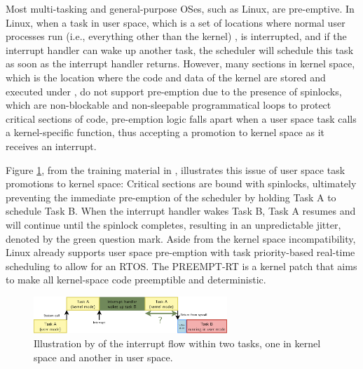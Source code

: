Most multi-tasking and general-purpose OSes, such as Linux, are pre-emptive. In Linux, when a task in user space, which is a set of locations where normal user processes run (i.e., everything other than the kernel) \cite{nlightnfotisAnswerWhatDifference2013}, is interrupted, and if the interrupt handler can wake up another task, the scheduler will schedule this task as soon as the interrupt handler returns. However, many sections in kernel space, which is the location where the code and data of the kernel are stored and executed under \cite{nlightnfotisAnswerWhatDifference2013}, do not support pre-emption due to the presence of spinlocks, which are non-blockable and non-sleepable programmatical loops to protect critical sections of code, pre-emption logic falls apart when a user space task calls a kernel-specific function, thus accepting a promotion to kernel space as it receives an interrupt.

Figure \ref{fig:bootlin_flow}, from the training material in \cite{bootlinUnderstandingLinuxRealtime2024}, illustrates this issue of user space task promotions to kernel space: Critical sections are bound with spinlocks, ultimately preventing the immediate pre-emption of the scheduler by holding Task A to schedule Task B. When the interrupt handler wakes Task B, Task A resumes and will continue until the spinlock completes, resulting in an unpredictable jitter, denoted by the green question mark. Aside from the kernel space incompatibility, Linux already supports user space pre-emption with task priority-based real-time scheduling to allow for an RTOS. The PREEMPT-RT is a kernel patch that aims to make all kernel-space code preemptible and deterministic.

\begin{figure}[h]
    \centering
    \includegraphics[width=0.65\textwidth]{assets/bootlin-interrupt-flow.png}
    \caption{Illustration by \cite{bootlinUnderstandingLinuxRealtime2024} of the interrupt flow within two tasks, one in kernel space and another in user space.}
    \label{fig:bootlin_flow}
\end{figure}

